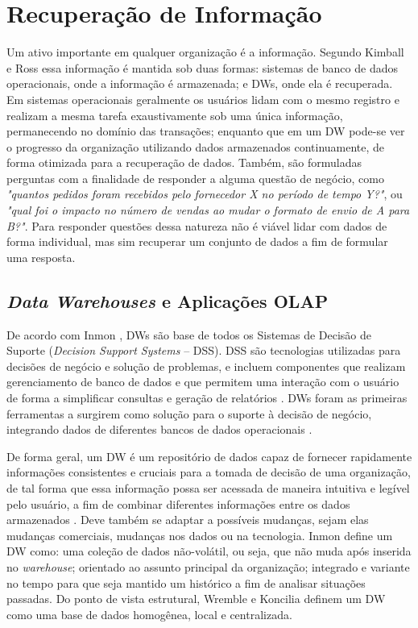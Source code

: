 \chapter{Recuperação de Informação}
\label{cap_2}

Um ativo importante em qualquer organização é a informação. Segundo Kimball e Ross \cite{kimball2002dw} essa informação é mantida sob duas formas: sistemas de banco de dados operacionais, onde a informação é armazenada; e DWs, onde ela é recuperada. Em sistemas operacionais geralmente os usuários lidam com o mesmo registro e realizam a mesma tarefa exaustivamente sob uma única informação, permanecendo no domínio das transações; enquanto que em um DW pode-se ver o progresso da organização utilizando dados armazenados continuamente, de forma otimizada para a recuperação de dados. Também, são formuladas perguntas com a finalidade de responder a alguma questão de negócio, como \textit{"quantos pedidos foram recebidos pelo fornecedor X no período de tempo Y?"}, ou \textit{"qual foi o impacto no número de vendas ao mudar o formato de envio de A para B?"}. Para responder questões dessa natureza não é viável lidar com dados de forma individual, mas sim recuperar um conjunto de dados a fim de formular uma resposta.


\section{\textit{Data Warehouses} e Aplicações OLAP}

De acordo com Inmon \cite{inmon2005building}, DWs são base de todos os Sistemas de Decisão de Suporte 
(\textit{Decision Support Systems} -- DSS). DSS são tecnologias utilizadas para decisões de negócio e solução de problemas, 
e incluem componentes que realizam gerenciamento de banco de dados e que 
permitem uma interação com o usuário de forma a simplificar consultas e geração de relatórios 
\cite{shim2002past}. DWs foram as primeiras ferramentas a surgirem como solução para o 
suporte à decisão de negócio, integrando dados de diferentes bancos de dados operacionais 
\cite{inmon2005building, kimball2002dw}.

De forma geral, um DW é um repositório de dados capaz de fornecer rapidamente 
informações consistentes e cruciais para a tomada de decisão de uma organização, 
de tal forma que essa informação possa ser acessada de maneira intuitiva e legível 
pelo usuário, a fim de combinar diferentes informações entre os dados armazenados 
\cite{kimball2002dw}. Deve também se adaptar a possíveis mudanças, sejam elas mudanças comerciais, mudanças nos dados ou na tecnologia. Inmon \cite{inmon2005building} define um DW como: uma coleção de dados não-volátil, ou seja, que não muda após inserida no \textit{warehouse}; orientado ao assunto principal da organização; integrado e variante no tempo para que seja mantido um histórico a fim de analisar situações passadas. Do ponto de vista estrutural, Wremble e Koncilia \cite{wrembel2007data} definem um DW como uma base de dados homogênea, local e centralizada.

